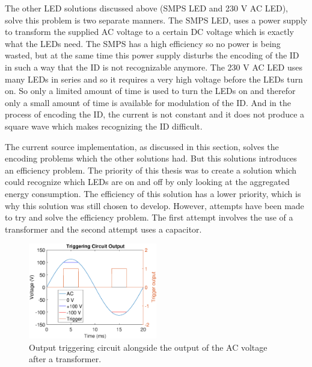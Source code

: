 	The other LED solutions discussed above (SMPS LED and 230 V AC LED), solve this problem is two separate manners.
	The SMPS LED, uses a power supply to transform the supplied AC voltage to a certain DC voltage which is exactly what the LEDs need.
	The SMPS has a high efficiency so no power is being wasted, but at the same time this power supply disturbs the encoding of the ID in such a way that the ID is not recognizable anymore.
	The 230 V AC LED uses many LEDs in series and so it requires a very high voltage before the LEDs turn on.
	So only a limited amount of time is used to turn the LEDs on and therefor only a small amount of time is available for modulation of the ID.
	And in the process of encoding the ID, the current is not constant and it does not produce a square wave which makes recognizing the ID difficult.


	The current source implementation, as discussed in this section, solves the encoding problems which the other solutions had.
	But this solutions introduces an efficiency problem.
	The priority of this thesis was to create a solution which could recognize which LEDs are on and off by only looking at the aggregated energy consumption.
	The efficiency of this solution has a lower priority, which is why this solution was still chosen to develop.
	However, attempts have been made to try and solve the efficiency problem.
	The first attempt involves the use of a transformer and the second attempt uses a capacitor.

	\begin{figure}[h]
		\centering
		\includegraphics[angle=0,width=0.5\textwidth]{chapters/hardware-chapters/AC/ac-modulator/custom-hardware/ac-current-source/ac-wave-lower-transformed-triggering.eps}
		\caption{Output triggering circuit alongside the output of the AC voltage after a transformer.}
		\label{fig:trigger-output-lower-transformed}
	\end{figure}


